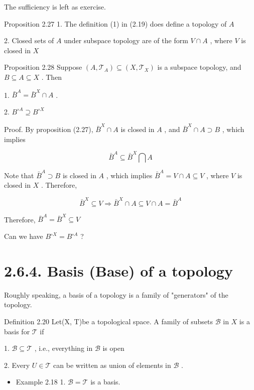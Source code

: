 The sufficiency is left as exercise.

Proposition 2.27 1. The definition (1) in (2.19) does define a topology of \(A\)

2. Closed sets of \(A\) under subspace topology are of the form \(V \cap  A\) , where \(V\) is closed in \(X\)

Proposition 2.28 Suppose \(\left( {A,{\mathcal{T}}_{A}}\right)  \subseteq  \left( {X,{\mathcal{T}}_{X}}\right)\) is a subspace topology, and \(B \subseteq  A \subseteq  X\) . Then

1. \({\bar{B}}^{A} = {\bar{B}}^{X} \cap  A\) .

2. \({B}^{\circ A} \supseteq  {B}^{\circ X}\)

Proof. By proposition (2.27), \({\bar{B}}^{X} \cap  A\) is closed in \(A\) , and \({\bar{B}}^{X} \cap  A \supset  B\) , which implies

\[
{\bar{B}}^{A} \subseteq  {\bar{B}}^{X}\bigcap A
\]

Note that \({\bar{B}}^{A} \supset  B\) is closed in \(A\) , which implies \({\bar{B}}^{A} = V \cap  A \subseteq  V\) , where \(V\) is closed in \(X\) . Therefore,

\[
{\bar{B}}^{X} \subseteq  V \Rightarrow  {\bar{B}}^{X} \cap  A \subseteq  V \cap  A = {\bar{B}}^{A}
\]

Therefore, \({\bar{B}}^{A} = {\bar{B}}^{X} \subseteq  V\)

Can we have \({B}^{\circ X} = {B}^{\circ A}\) ?

\section*{2.6.4. Basis (Base) of a topology}

Roughly speaking, a basis of a topology is a family of "generators" of the topology.

Definition 2.20 Let(X, T)be a topological space. A family of subsets \(\mathcal{B}\) in \(X\) is a basis for \(\mathcal{T}\) if

1. \(\mathcal{B} \subseteq  \mathcal{T}\) , i.e., everything in \(\mathcal{B}\) is open

2. Every \(U \in  \mathcal{T}\) can be written as union of elements in \(\mathcal{B}\) .

\begin{itemize}
\item Example 2.18 1. \(\mathcal{B} = \mathcal{T}\) is a basis.
\end{itemize}

